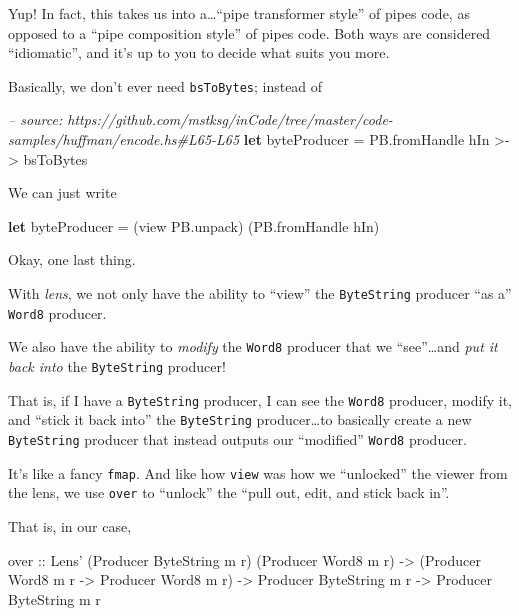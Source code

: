 \documentclass[]{article}
\newenvironment{Shaded}{}{}
\newcommand{\KeywordTok}[1]{\textcolor[rgb]{0.00,0.44,0.13}{\textbf{#1}}}
\newcommand{\DataTypeTok}[1]{\textcolor[rgb]{0.56,0.13,0.00}{#1}}
\newcommand{\CommentTok}[1]{\textcolor[rgb]{0.38,0.63,0.69}{\textit{#1}}}
\newcommand{\OtherTok}[1]{\textcolor[rgb]{0.00,0.44,0.13}{#1}}
\newcommand{\FunctionTok}[1]{\textcolor[rgb]{0.02,0.16,0.49}{#1}}
\newcommand{\NormalTok}[1]{#1}
\begin{document}
Yup! In fact, this takes us into a\ldots{}``pipe transformer style'' of pipes
code, as opposed to a ``pipe composition style'' of pipes code. Both ways are
considered ``idiomatic'', and it's up to you to decide what suits you more.

Basically, we don't ever need \texttt{bsToBytes}; instead of

\begin{Shaded}
\begin{Highlighting}[]
\CommentTok{-- source: https://github.com/mstksg/inCode/tree/master/code-samples/huffman/encode.hs#L65-L65}
    \KeywordTok{let}\NormalTok{ byteProducer }\FunctionTok{=}\NormalTok{ PB.fromHandle hIn }\FunctionTok{>->}\NormalTok{ bsToBytes}
\end{Highlighting}
\end{Shaded}

We can just write

\begin{Shaded}
\begin{Highlighting}[]
\KeywordTok{let}\NormalTok{ byteProducer }\FunctionTok{=}\NormalTok{ (view PB.unpack) (PB.fromHandle hIn)}
\end{Highlighting}
\end{Shaded}

Okay, one last thing.

With \emph{lens}, we not only have the ability to ``view'' the
\texttt{ByteString} producer ``as a'' \texttt{Word8} producer.

We also have the ability to \emph{modify} the \texttt{Word8} producer that we
``see''\ldots{}and \emph{put it back into} the \texttt{ByteString} producer!

That is, if I have a \texttt{ByteString} producer, I can see the \texttt{Word8}
producer, modify it, and ``stick it back into'' the \texttt{ByteString}
producer\ldots{}to basically create a new \texttt{ByteString} producer that
instead outputs our ``modified'' \texttt{Word8} producer.

It's like a fancy \texttt{fmap}. And like how \texttt{view} was how we
``unlocked'' the viewer from the lens, we use \texttt{over} to ``unlock'' the
``pull out, edit, and stick back in''.

That is, in our case,

\begin{Shaded}
\begin{Highlighting}[]
\OtherTok{over ::} \DataTypeTok{Lens'}\NormalTok{ (}\DataTypeTok{Producer} \DataTypeTok{ByteString}\NormalTok{ m r) (}\DataTypeTok{Producer} \DataTypeTok{Word8}\NormalTok{ m r)}
     \OtherTok{->}\NormalTok{ (}\DataTypeTok{Producer} \DataTypeTok{Word8}\NormalTok{ m r }\OtherTok{->} \DataTypeTok{Producer} \DataTypeTok{Word8}\NormalTok{ m r)}
     \OtherTok{->} \DataTypeTok{Producer} \DataTypeTok{ByteString}\NormalTok{ m r}
     \OtherTok{->} \DataTypeTok{Producer} \DataTypeTok{ByteString}\NormalTok{ m r}
\end{Highlighting}
\end{Shaded}
\end{document}
